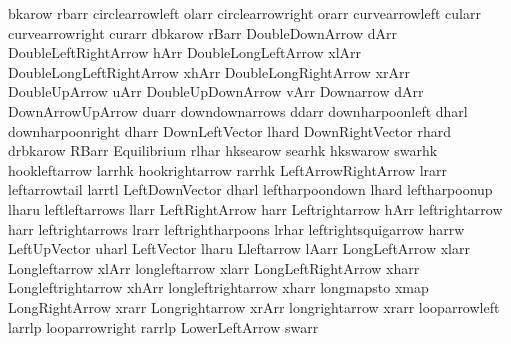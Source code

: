 bkarow                   rbarr
 circlearrowleft          olarr
 circlearrowright         orarr
 curvearrowleft           cularr
 curvearrowright          curarr
 dbkarow                  rBarr
 DoubleDownArrow          dArr
 DoubleLeftRightArrow     hArr
 DoubleLongLeftArrow      xlArr
 DoubleLongLeftRightArrow xhArr
 DoubleLongRightArrow     xrArr
 DoubleUpArrow            uArr
 DoubleUpDownArrow        vArr
 Downarrow                dArr
 DownArrowUpArrow         duarr
 downdownarrows           ddarr
 downharpoonleft          dharl
 downharpoonright         dharr
 DownLeftVector           lhard
 DownRightVector          rhard
 drbkarow                 RBarr
 Equilibrium              rlhar
 hksearow                 searhk
 hkswarow                 swarhk
 hookleftarrow            larrhk
 hookrightarrow           rarrhk
 LeftArrowRightArrow      lrarr
 leftarrowtail            larrtl
 LeftDownVector           dharl
 leftharpoondown          lhard
 leftharpoonup            lharu
 leftleftarrows           llarr
 LeftRightArrow           harr
 Leftrightarrow           hArr
 leftrightarrow           harr
 leftrightarrows          lrarr
 leftrightharpoons        lrhar
 leftrightsquigarrow      harrw
 LeftUpVector             uharl
 LeftVector               lharu
 Lleftarrow               lAarr
 LongLeftArrow            xlarr
 Longleftarrow            xlArr
 longleftarrow            xlarr
 LongLeftRightArrow       xharr
 Longleftrightarrow       xhArr
 longleftrightarrow       xharr
 longmapsto               xmap
 LongRightArrow           xrarr
 Longrightarrow           xrArr
 longrightarrow           xrarr
 looparrowleft            larrlp
 looparrowright           rarrlp
 LowerLeftArrow           swarr

